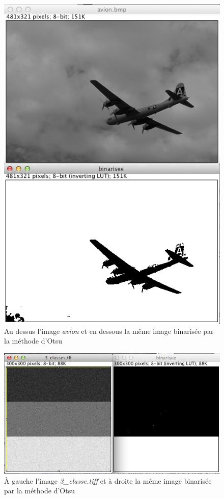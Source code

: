 \documentclass[a4paper,10pt]{article}
\begin{document}
\begin{figure}[ht]
\begin{center}
	\includegraphics[width=15cm]{images/avion}
\end{center}
	\caption{Au dessus l'image \emph{avion} et en dessous la m\^eme image binaris\'ee par la m\'ethode d'Otsu}
	\label{}
\end{figure}

\begin{figure}[ht]
\begin{center}
	\includegraphics[width=15cm]{images/3_classe.png}
\end{center}
	\caption{\`A gauche l'image \emph{3\_classe.tiff} et \`a droite la m\^eme image binaris\'ee par la m\'ethode d'Otsu}
	\label{3_classe}
\end{figure}
\end{document}
